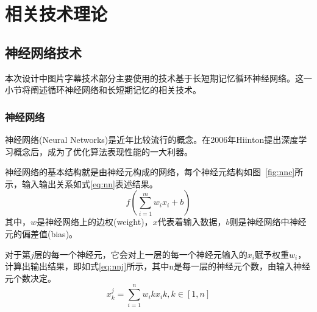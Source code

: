 
\chapter{相关技术理论}

\section{神经网络技术}
本次设计中图片字幕技术部分主要使用的技术基于长短期记忆循环神经网络。这一小节将阐述循环神经网络和长短期记忆的相关技术。
\subsection{神经网络}
神经网络(Neural Networks)是近年比较流行的概念。在2006年Hiinton提出深度学习概念后，成为了优化算法表现性能的一大利器。

神经网络的基本结构就是由神经元构成的网络，每个神经元结构如图~\ref{fig:nnc}所示，输入输出关系如式\eqref{eq:nn}表述结果。
\begin{equation}
    \label{eq:nn}
    f( \sum\limits_{i=1}^{m} w_i x_i + b ) 
\end{equation}
其中，$w$是神经网络上的边权(weight)，$x$代表着输入数据，$b$则是神经网络中神经元的偏差值(bias)。

对于第$j$层的每一个神经元，它会对上一层的每一个神经元输入的$x_i$赋予权重$w_i$，计算出输出结果，即如式\eqref{eq:nnj}所示，其中n是每一层的神经元个数，由输入神经元个数决定。
\begin{equation}
    \label{eq:nnj}
    x_k^j = \sum\limits_{i=1}^{n} w_ik x_ik, k\in \left[1,n\right]
\end{equation}

